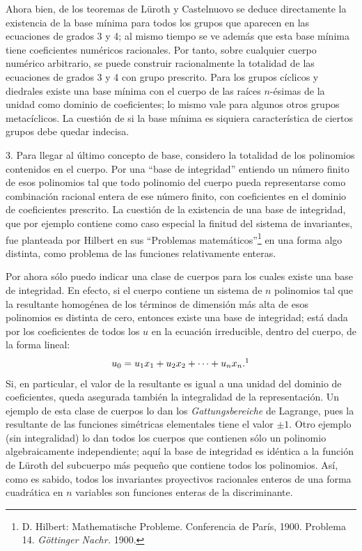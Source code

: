 \documentclass[11pt]{article}
\begin{document}
Ahora bien, de los teoremas de Lüroth y Castelnuovo se deduce directamente la existencia de la base mínima para todos los grupos que aparecen en las ecuaciones de grados 3 y 4; al mismo tiempo se ve además que esta base mínima tiene coeficientes numéricos racionales. Por tanto, sobre cualquier cuerpo numérico arbitrario, se puede construir racionalmente la totalidad de las ecuaciones de grados 3 y 4 con grupo prescrito. Para los grupos cíclicos y diedrales existe una base mínima con el cuerpo de las raíces $n$-ésimas de la unidad como dominio de coeficientes; lo mismo vale para algunos otros grupos metacíclicos. La cuestión de si la base mínima es siquiera característica de ciertos grupos debe quedar indecisa.

3. Para llegar al último concepto de base, considero la totalidad de los polinomios contenidos en el cuerpo. Por una ``base de integridad'' entiendo un número finito de esos polinomios tal que todo polinomio del cuerpo pueda representarse como combinación racional entera de ese número finito, con coeficientes en el dominio de coeficientes prescrito. La cuestión de la existencia de una base de integridad, que por ejemplo contiene como caso especial la finitud del sistema de invariantes, fue planteada por Hilbert en sus ``Problemas matemáticos''\footnote{D. Hilbert: Mathematische Probleme. Conferencia de París, 1900. Problema 14. \emph{Göttinger Nachr.} 1900.} en una forma algo distinta, como problema de las funciones relativamente enteras.

Por ahora sólo puedo indicar una clase de cuerpos para los cuales existe una base de integridad. En efecto, si el cuerpo contiene un sistema de $n$ polinomios tal que la resultante homogénea de los términos de dimensión más alta de esos polinomios es distinta de cero, entonces existe una base de integridad; está dada por los coeficientes de todos los $u$ en la ecuación irreducible, dentro del cuerpo, de la forma lineal:
\[
  u_0=u_1x_1+u_2x_2+\cdots+u_nx_n.\footnotemark
\]
Si, en particular, el valor de la resultante es igual a una unidad del dominio de coeficientes, queda asegurada también la integralidad de la representación. Un ejemplo de esta clase de cuerpos lo dan los \emph{Gattungsbereiche} de Lagrange, pues la resultante de las funciones simétricas elementales tiene el valor $\pm 1$. Otro ejemplo (sin integralidad) lo dan todos los cuerpos que contienen sólo un polinomio algebraicamente independiente; aquí la base de integridad es idéntica a la función de Lüroth del subcuerpo más pequeño que contiene todos los polinomios. Así, como es sabido, todos los invariantes proyectivos racionales enteros de una forma cuadrática en $n$ variables son funciones enteras de la discriminante.
\end{document}
